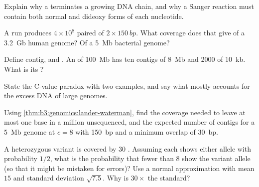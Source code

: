 \begin{exercise}[$\star$]\label{exo:b3:genomics:1}
Explain why a  terminates a growing DNA chain, and why
a Sanger reaction must contain both normal and dideoxy forms of each
nucleotide.
\end{exercise}

\begin{exercise}[$\star$]\label{exo:b3:genomics:2}
A run produces $4\times 10^{8}$ paired  of $2\times \qty{150}{bp}$.
What coverage does that give of a \qty{3.2}{Gb} human genome? Of a
\qty{5}{Mb} bacterial genome?
\end{exercise}

\begin{exercise}[$\star$]\label{exo:b3:genomics:3}
Define contig,  and . An  of \qty{100}{Mb} has ten
contigs of \qty{8}{Mb} and \num{2000} of \qty{10}{kb}. What is its ?
\end{exercise}

\begin{exercise}[$\star$]\label{exo:b3:genomics:4}
State the C-value paradox with two examples, and say what mostly
accounts for the excess DNA of large genomes.
\end{exercise}

\begin{exercise}[$\star\star$]\label{exo:b3:genomics:5}
Using \cref{thm:b3:genomics:lander-waterman}, find the coverage needed
to leave at most one base in a million unsequenced, and the expected
number of contigs for a \qty{5}{Mb} genome  at $c = 8$ with
\qty{150}{bp}  and a minimum overlap of \qty{30}{bp}.
\end{exercise}

\begin{exercise}[$\star\star$]\label{exo:b3:genomics:6}
A heterozygous variant is covered by $30$ . Assuming each 
shows either allele with probability $1/2$, what is the probability
that fewer than $8$  show the variant allele (so that it might be
mistaken for errors)? Use a normal approximation with mean $15$ and
standard deviation $\sqrt{7.5}$. Why is $30\times$ the standard?
\end{exercise}

